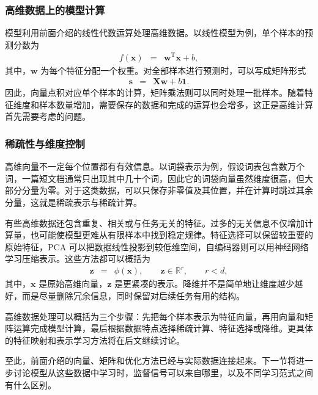 \subsubsection{高维数据上的模型计算}

模型利用前面介绍的线性代数运算处理高维数据。以线性模型为例，单个样本的预测分数为
\begin{eqnarray}
f(\mathbf{x}) &=& \mathbf{w}^{\mathrm{T}}\mathbf{x}+b,
\end{eqnarray}
其中，$\mathbf{w}$ 为每个特征分配一个权重。对全部样本进行预测时，可以写成矩阵形式
\begin{eqnarray}
\mathbf{s} &=& \mathbf{X}\mathbf{w}+b\mathbf{1}.
\end{eqnarray}
因此，向量点积对应单个样本的计算，矩阵乘法则可以同时处理一批样本。随着特征维度和样本数量增加，需要保存的数据和完成的运算也会增多，这正是高维计算首先需要考虑的问题。

\subsubsection{稀疏性与维度控制}

高维向量不一定每个位置都有有效信息。以词袋表示为例，假设词表包含数万个词，一篇短文档通常只出现其中几十个词，因此它的词袋向量虽然维度很高，但大部分分量为零。对于这类数据，可以只保存非零值及其位置，并在计算时跳过其余分量，这就是稀疏表示与稀疏计算。

有些高维数据还包含重复、相关或与任务无关的特征。过多的无关信息不仅增加计算量，也可能使模型更难从有限样本中找到稳定规律。特征选择可以保留较重要的原始特征，PCA 可以把数据线性投影到较低维空间，自编码器则可以用神经网络学习压缩表示。这些方法都可以概括为
\begin{eqnarray}
\mathbf{z} &=& \phi(\mathbf{x}),
\qquad
\mathbf{z}\in\mathbb{R}^{r},\qquad r<d,
\end{eqnarray}
其中，$\mathbf{x}$ 是原始高维向量，$\mathbf{z}$ 是更紧凑的表示。降维并不是简单地让维度越少越好，而是尽量删除冗余信息，同时保留对后续任务有用的结构。

\begin{importantnote}
  高维数据处理可以概括为三个步骤：先把每个样本表示为特征向量，再用向量和矩阵运算完成模型计算，最后根据数据特点选择稀疏计算、特征选择或降维。更具体的特征映射和表示学习方法将在后文继续讨论。
\end{importantnote}

至此，前面介绍的向量、矩阵和优化方法已经与实际数据连接起来。下一节将进一步讨论模型从这些数据中学习时，监督信号可以来自哪里，以及不同学习范式之间有什么区别。

